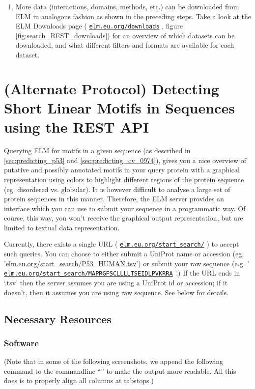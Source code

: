 \documentclass[12pt]{article}
\newcommand\rurl[1]{%
	\href{http://#1}{\nolinkurl{#1}}%
}
\begin{document}
\begin{enumerate}
\item More data (interactions, domains, methods, etc.) can be downloaded from
	ELM in analogous fashion as shown in the preceding steps. Take a look
	at the ELM Downloads page (\rurl{elm.eu.org/downloads}, figure
	\ref{fig:search_REST_downloads}) for an overview of which datasets can
	be downloaded, and what different filters and formats are available
	for each dataset.

\end{enumerate}

\clearpage

\section{(Alternate Protocol) Detecting Short Linear Motifs in Sequences using the REST API}
\label{sec:predicting_REST}

Querying ELM for motifs in a given sequence (as described in
\ref{sec:predicting_p53} and \ref{sec:predicting_cv_0974}), gives you a nice
overview of putative and possibly
annotated motifs in your query protein with a graphical representation
using colors to highlight different regions of the protein sequence (eg.
disordered vs. globular). It is however difficult to analyse a large set
of protein sequences in this manner. Therefore, the ELM server
provides an interface which you can use to submit your sequence in a
programmatic way. Of course, this way, you won't receive the graphical
output representation, but are limited to textual data representation.

Currently, there exists a single URL (\rurl{elm.eu.org/start\_search/})
to accept such queries. You can choose to either submit a UniProt name
or accession (eg. '\url{elm.eu.org/start\_search/P53\_HUMAN.tsv}') or
submit your raw sequence (e.g. '\rurl{elm.eu.org/start\_search/MAPRGFSCLLLLTSEIDLPVKRRA}'.)
If the URL ends in `.tsv' then the server assumes you
are using a UniProt id or accession; if it doesn't, then it assumes you
are using raw sequence. See below for details.

%
%
\subsection*{Necessary Resources}
\subsubsection*{Software}
%
(Note that in some of the following screenshots, we append the following
command to the commandline ``'' to make the output more
readable. All this does is to properly align all columns at tabstops.)
\end{document}
